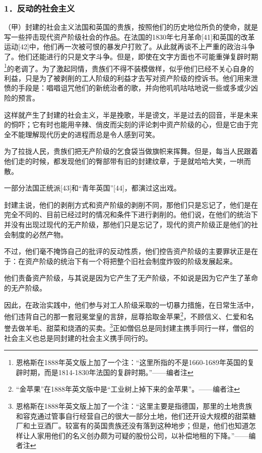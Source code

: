 \documentclass[UTF8,zihao=-4,a4paper]{ctexart}
\begin{document}
\subsubsection*{1．反动的社会主义}
（甲）封建的社会主义法国和英国的贵族，按照他们的历史地位所负的使命，就是写一些抨击现代资产阶级社会的作品。在法国的1830年七月革命[41]和英国的改革运动[42]中，他们再一次被可恨的暴发户打败了。从此就再谈不上严重的政治斗争了。他们还能进行的只是文字斗争。但是，即使在文字方面也不可能重弹复辟时期\footnote{恩格斯在1888年英文版上加了一个注：“这里所指的不是1660-1689年英国的复辟时期，而是1814-1830年法国的复辟时期。”——编者注}的老调了。为了激起同情，贵族们不得不装模做样，似乎他们已经不关心自身的利益，只是为了被剥削的工人阶级的利益才去写对资产阶级的控诉书。他们用来泄愤的手段是：唱唱诅咒他们的新统治者的歌，并向他叽叽咕咕地说一些或多或少凶险的预言。\par
这样就产生了封建的社会主义，半是挽歌，半是谤文，半是过去的回音，半是未来的恫吓；它有时也能用辛辣、俏皮而尖刻的评论刺中资产阶级的心，但是它由于完全不能理解现代历史的进程而总是令人感到可笑。\par
为了拉拢人民，贵族们把无产阶级的乞食袋当做旗帜来挥舞。但是，每当人民跟着他们走的时候，都发现他们的臀部带有旧的封建纹章，于是就哈哈大笑，一哄而散。\par
一部分法国正统派[43]和“青年英国”[44]，都演过这出戏。\par
封建主说，他们的剥削方式和资产阶级的剥削不同，那他们只是忘记了，他们是在完全不同的、目前已经过时的情况和条件下进行剥削的。他们说，在他们的统治下并没有出现过现代的无产阶级，那他们只是忘记了，现代的资产阶级正是他们的社会制度的必然产物。\par
不过，他们毫不掩饰自己的批评的反动性质，他们控告资产阶级的主要罪状正是在于：在资产阶级的统治下有一个将把整个旧社会制度炸毁的阶级发展起来。\par
他们责备资产阶级，与其说是因为它产生了无产阶级，不如说是因为它产生了革命的无产阶级。\par
因此，在政治实践中，他们参与对工人阶级采取的一切暴力措施，在日常生活中，他们违背自己的那一套冠冕堂皇的言辞，屈尊拾取金苹果\footnote{“金苹果”在1888年英文版中是“工业树上掉下来的金苹果”。——编者注}，不顾信义、仁爱和名誉去做羊毛、甜菜和烧酒的买卖。\footnote{恩格斯在1888年英文版上加了一个注：“这里主要是指德国，那里的土地贵族和容克通过管事自行经营自己的很大一部分土地，他们还开设大规模的甜菜糖厂和土豆酒厂。较富有的英国贵族还没有落到这种地步；但是，他们也知道怎样让人家用他们的名义创办颇为可疑的股份公司，以补偿地租的下降。”——编者注}正如僧侣总是同封建主携手同行一样，僧侣的社会主义也总是同封建的社会主义携手同行的。\par
\end{document}
